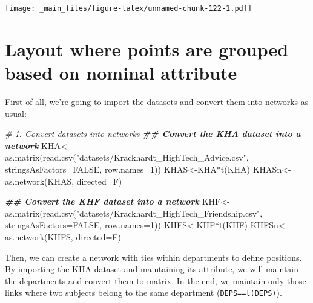 \documentclass[
  notitlepage,
  onecolumn,
  openany]{book}
\newenvironment{Shaded}{\begin{snugshade}}{\end{snugshade}}
\newcommand{\AttributeTok}[1]{\textcolor[rgb]{0.77,0.63,0.00}{#1}}
\newcommand{\CommentTok}[1]{\textcolor[rgb]{0.56,0.35,0.01}{\textit{#1}}}
\newcommand{\ConstantTok}[1]{\textcolor[rgb]{0.00,0.00,0.00}{#1}}
\newcommand{\DecValTok}[1]{\textcolor[rgb]{0.00,0.00,0.81}{#1}}
\newcommand{\DocumentationTok}[1]{\textcolor[rgb]{0.56,0.35,0.01}{\textbf{\textit{#1}}}}
\newcommand{\FunctionTok}[1]{\textcolor[rgb]{0.00,0.00,0.00}{#1}}
\newcommand{\NormalTok}[1]{#1}
\newcommand{\OtherTok}[1]{\textcolor[rgb]{0.56,0.35,0.01}{#1}}
\newcommand{\SpecialCharTok}[1]{\textcolor[rgb]{0.00,0.00,0.00}{#1}}
\newcommand{\StringTok}[1]{\textcolor[rgb]{0.31,0.60,0.02}{#1}}
\begin{document}
\texttt{[image: \_main\_files/figure-latex/unnamed-chunk-122-1.pdf]}

\hypertarget{layout-where-points-are-grouped-based-on-nominal-attribute}{%
\section{Layout where points are grouped based on nominal attribute}\label{layout-where-points-are-grouped-based-on-nominal-attribute}}

First of all, we're going to import the datasets and convert them into networks as usual:

\begin{Shaded}
\begin{Highlighting}[]
\CommentTok{\# 1. Convert datasets into networks}
\DocumentationTok{\#\# Convert the KHA dataset into a network}
\NormalTok{KHA}\OtherTok{\textless{}{-}}\FunctionTok{as.matrix}\NormalTok{(}\FunctionTok{read.csv}\NormalTok{(}\StringTok{"datasets/Krackhardt\_HighTech\_Advice.csv"}\NormalTok{,}
                        \AttributeTok{stringsAsFactors=}\ConstantTok{FALSE}\NormalTok{, }\AttributeTok{row.names=}\DecValTok{1}\NormalTok{))}
\NormalTok{KHAS}\OtherTok{\textless{}{-}}\NormalTok{KHA}\SpecialCharTok{*}\FunctionTok{t}\NormalTok{(KHA)}
\NormalTok{KHASn}\OtherTok{\textless{}{-}}\FunctionTok{as.network}\NormalTok{(KHAS, }\AttributeTok{directed=}\NormalTok{F)}

\DocumentationTok{\#\# Convert the KHF dataset into a network}
\NormalTok{KHF}\OtherTok{\textless{}{-}}\FunctionTok{as.matrix}\NormalTok{(}\FunctionTok{read.csv}\NormalTok{(}\StringTok{"datasets/Krackhardt\_HighTech\_Friendship.csv"}\NormalTok{,}
                        \AttributeTok{stringsAsFactors=}\ConstantTok{FALSE}\NormalTok{, }\AttributeTok{row.names=}\DecValTok{1}\NormalTok{))}
\NormalTok{KHFS}\OtherTok{\textless{}{-}}\NormalTok{KHF}\SpecialCharTok{*}\FunctionTok{t}\NormalTok{(KHF)}
\NormalTok{KHFSn}\OtherTok{\textless{}{-}}\FunctionTok{as.network}\NormalTok{(KHFS, }\AttributeTok{directed=}\NormalTok{F)}
\end{Highlighting}
\end{Shaded}

Then, we can create a network with ties within departments to define positions. By importing the KHA dataset and maintaining its attribute, we will maintain the departments and convert them to matrix. In the end, we maintain only those links where two subjects belong to the same department (\texttt{DEPS==t(DEPS)}).
\end{document}
